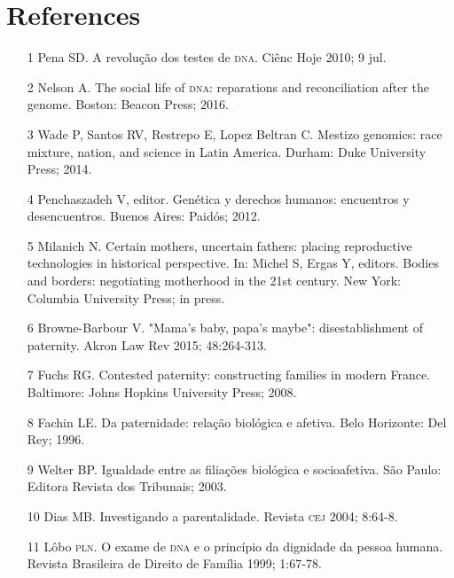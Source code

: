 \documentclass{article}
\begin{document}
\section*{References}
\begin{itemize}

\item[1] Pena SD. A revolução dos testes de \textsc{dna}. Ciênc Hoje 2010; 9 jul.

\item[2] Nelson A. The social life of \textsc{dna}: reparations and reconciliation
after the genome. Boston: Beacon Press; 2016.

\item[3] Wade P, Santos RV, Restrepo E, Lopez Beltran C. Mestizo genomics:
race mixture, nation, and science in Latin America. Durham: Duke University
Press; 2014.

\item[4] Penchaszadeh V, editor. Genética y derechos humanos: encuentros y
desencuentros. Buenos Aires: Paidós; 2012.

\item[5] Milanich N. Certain mothers, uncertain fathers: placing reproductive
technologies in historical perspective. In: Michel S, Ergas Y, editors. Bodies
and borders: negotiating motherhood in the 21st century. New York: Columbia
University Press; in press.

\item[6] Browne-Barbour V. "Mama's baby, papa's maybe": disestablishment of
paternity. Akron Law Rev 2015; 48:264-313.

\item[7] Fuchs RG. Contested paternity: constructing families in modern
France. Baltimore: Johns Hopkins University Press; 2008.

\item[8] Fachin LE. Da paternidade: relação biológica e afetiva. Belo
Horizonte: Del Rey; 1996.

\item[9] Welter BP. Igualdade entre as filiações biológica e socioafetiva.
São Paulo: Editora Revista dos Tribunais; 2003.

\item[10] Dias MB. Investigando a parentalidade. Revista \textsc{cej} 2004; 8:64-8.

\item[11] Lôbo \textsc{pln}. O exame de \textsc{dna} e o princípio da dignidade da pessoa
humana. Revista Brasileira de Direito de Família 1999; 1:67-78.


\end{itemize}
\end{document}
